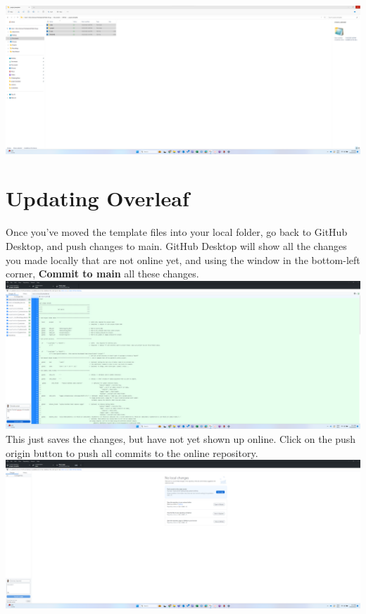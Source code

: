 \documentclass[12pt]{article}
\begin{document}
\includegraphics[width=1\textwidth]{Instructions/project_template_screenshots/project_template_06.png} \\

\section{Updating Overleaf}

Once you've moved the template files into your local folder, go back to GitHub Desktop, and push changes to main. GitHub Desktop will show all the changes you made locally that are not online yet, and using the window in the bottom-left corner, \textbf{Commit to main} all these changes.  \\

\includegraphics[width=1\textwidth]{Instructions/project_template_screenshots/project_template_07.png} \\

This just saves the changes, but have not yet shown up online. Click on the push origin button to push all commits to the online repository. \\

\includegraphics[width=1\textwidth]{Instructions/project_template_screenshots/project_template_08.png} \\
\end{document}
